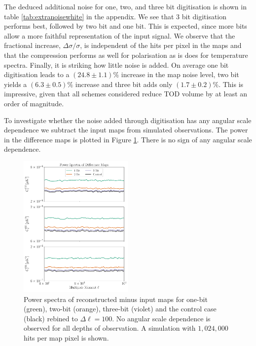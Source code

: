 \documentclass[apj]{emulateapj}
\begin{document}
The deduced additional noise for one, two, and three bit digitisation is shown in table \ref{tab:extranoisewhite} in the appendix. We see that 3 bit digitisation performs best, followed by two bit and one bit. This is expected, since more bits allow a more faithful representation of the input signal. We observe that the fractional increase, $\Delta \sigma / \sigma$, is independent of the hits per pixel in the maps and that the compression performs as well for polarisation as is does for temperature spectra. Finally, it is striking how little noise is added. On average one bit digitisation leads to a $(24.8\pm 1.1)\%$ increase in the map noise level, two bit yields a $(6.3\pm0.5)\%$ increase and three bit adds only $(1.7\pm0.2)\%$. This is impressive, given that all schemes considered reduce TOD volume by at least an order of magnitude.

To investigate whether the noise added through digitisation has any angular scale dependence we subtract the input maps from simulated observations. The power in the difference maps is plotted in Figure \ref{fig:diffpswn}. There is no sign of any angular scale dependence.


\begin{figure}[htb]\centering
\includegraphics[width=0.5\textwidth,clip]{Plots/diffwn.pdf}
  \caption[Current ]{
  Power spectra of reconstructed minus input maps for one-bit (green), two-bit (orange), three-bit (violet) and the control case (black) rebined to $\Delta \ell = 100$. No angular scale dependence is observed for all depths of observation. A simulation with $1,024,000$ hits per map pixel is shown.
\label{fig:diffpswn}
}
\end{figure}
\end{document}
